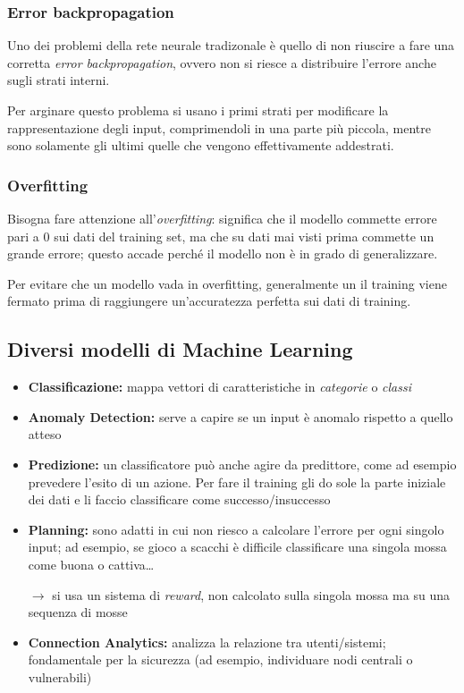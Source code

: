 \documentclass{report}
\begin{document}
\subsubsection{Error backpropagation}
Uno dei problemi della rete neurale tradizonale è quello di non riuscire a fare una corretta \textit{error backpropagation}, ovvero non 
si riesce a distribuire l'errore anche sugli strati interni.

\noindent Per arginare questo problema si usano i primi strati per modificare la rappresentazione degli input, comprimendoli 
in una parte più piccola, mentre sono solamente gli 
ultimi quelle che vengono effettivamente addestrati.

\subsubsection{Overfitting}
Bisogna fare attenzione all'\textit{overfitting}: significa che il modello commette errore pari a 0 sui dati del training set, ma che 
su dati mai visti prima commette un grande errore; questo accade perché il modello non è in grado di generalizzare.

\noindent Per evitare che un modello vada in overfitting, generalmente un il training viene fermato prima di raggiungere un'accuratezza perfetta 
sui dati di training.


\subsection{Diversi modelli di Machine Learning}
\begin{itemize}
    \item \textbf{Classificazione:} mappa vettori di caratteristiche in \textit{categorie} o \textit{classi}
    \item \textbf{Anomaly Detection:} serve a capire se un input è anomalo rispetto a quello atteso 
    \item \textbf{Predizione:} un classificatore può anche agire da predittore, come ad esempio prevedere l'esito di un azione. Per fare il training 
    gli do sole la parte iniziale dei dati e li faccio classificare come successo/insuccesso
    \item \textbf{Planning:} sono adatti in cui non riesco a calcolare l'errore per ogni singolo input; ad esempio, se gioco a scacchi è difficile 
    classificare una singola mossa come buona o cattiva\dots

    $\rightarrow$ si usa un sistema di \textit{reward}, non calcolato sulla singola mossa ma su una sequenza di mosse
    \item \textbf{Connection Analytics:} analizza la relazione tra utenti/sistemi; fondamentale per la sicurezza (ad esempio, individuare 
    nodi centrali o vulnerabili)
\end{itemize}
\end{document}
